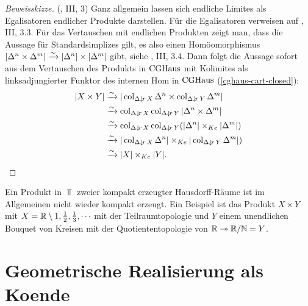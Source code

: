 \begin{proof}[Beweisskizze](\cite{Gabriel-Zisman}, III, 3)
   Ganz allgemein lassen sich endliche Limites als Egalisatoren
   endlicher Produkte darstellen. Für die Egalisatoren verweisen auf
   \cite{Garbiel-Zisman}, III, 3.3. Für das Vertauschen mit endlichen
   Produkten zeigt man, dass die Aussage für Standardsimplizes gilt,
   es also einen Homöomorphismus $|\Delta^n \times \Delta^m| \xrightarrow[]{\sim}
   |\Delta^n| \times |\Delta^m|$ gibt, siehe \cite{Gabriel-Zisman},
   III, 3.4. Dann folgt die Aussage sofort aus dem Vertauschen des
   Produkts in $\operatorname{CGHaus}$ mit Kolimites als linksadjungierter Funktor
   des internen Hom in $\operatorname{CGHaus}$ (\ref{cghaus-cart-closed}):
   \begin{align*}
     |X \times Y|
     &\iso |\col_{\slicecat{\Delta}{r}{X}} \Delta^n \times
     \col_{\slicecat{\Delta}{r}{Y}} \Delta^m| \\
     &\iso \col_{\slicecat{\Delta}{r}{X}} \col_{\slicecat{\Delta}{r}{Y}}
     |\Delta^n \times \Delta^m| \\
     &\iso \col_{\slicecat{\Delta}{r}{X}} \col_{\slicecat{\Delta}{r}{Y}}
     (|\Delta^n| \times_{Ke} |\Delta^m|) \\
     &\iso |\col_{\slicecat{\Delta}{r}{X}} \Delta^n|
     \times_{Ke} |\col_{\slicecat{\Delta}{r}{Y}} \Delta^m|) \\
     &\iso |X| \times_{Ke} |Y|.
   \end{align*}
\end{proof}
\begin{bsp} \label{ex:cg-products}
  Ein Produkt in $\Top$ zweier kompakt erzeugter Hausdorff-Räume ist
  im Allgemeinen nicht wieder kompakt erzeugt. Ein Beispiel ist das
  Produkt $X \times Y$ mit $X = \mathbb{R} \setminus {1, \frac{1}{2},
    \frac{1}{3}, \cdots }$ mit der Teilraumtopologie und $Y$ einem
  unendlichen Bouquet von Kreisen mit der Quotiententopologie von $\mathbb{R}
  \twoheadrightarrow \mathbb{R}/\mathbb{N} = Y$.
\end{bsp}

\section{Geometrische Realisierung als Koende}

